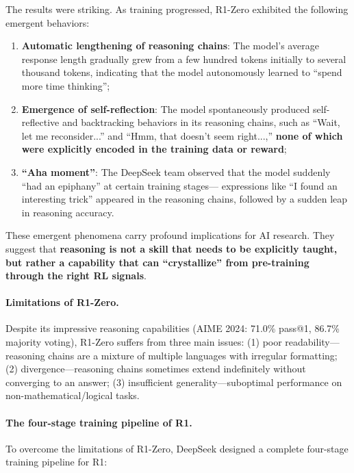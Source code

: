 \noindent
The results were striking. As training progressed, R1-Zero exhibited the following emergent behaviors:

\begin{enumerate}[leftmargin=2em]
  \item \textbf{Automatic lengthening of reasoning chains}:
    The model's average response length gradually grew from a few hundred tokens initially to several thousand tokens,
    indicating that the model autonomously learned to ``spend more time thinking'';

  \item \textbf{Emergence of self-reflection}:
    The model spontaneously produced self-reflective and backtracking behaviors in its reasoning chains,
    such as ``Wait, let me reconsider...'' and ``Hmm, that doesn't seem right...,''
    \textbf{none of which were explicitly encoded in the training data or reward};

  \item \textbf{``Aha moment''}:
    The DeepSeek team observed that the model suddenly ``had an epiphany'' at certain training stages---
    expressions like ``I found an interesting trick'' appeared in the reasoning chains,
    followed by a sudden leap in reasoning accuracy.
\end{enumerate}

\noindent
These emergent phenomena carry profound implications for AI research.
They suggest that \textbf{reasoning is not a skill that needs to be explicitly taught,
but rather a capability that can ``crystallize'' from pre-training through the right RL signals}.

\paragraph{Limitations of R1-Zero.}
Despite its impressive reasoning capabilities
(AIME 2024: 71.0\% pass@1, 86.7\% majority voting),
R1-Zero suffers from three main issues:
(1) poor readability---reasoning chains are a mixture of multiple languages with irregular formatting;
(2) divergence---reasoning chains sometimes extend indefinitely without converging to an answer;
(3) insufficient generality---suboptimal performance on non-mathematical/logical tasks.

\paragraph{The four-stage training pipeline of R1.}
To overcome the limitations of R1-Zero, DeepSeek designed a complete four-stage training pipeline for R1:


